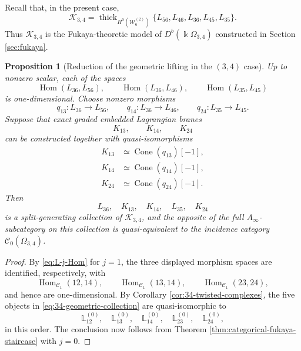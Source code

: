 \documentclass[12pt,a4paper,english,reqno]{amsart}
\theoremstyle{plain}
\newtheorem{proposition}[theorem]{Proposition}
\theoremstyle{definition}
\newcommand{\Hom}{\operatorname{Hom}}
\newcommand{\C}{\mathcal C}
\begin{document}
Recall that, in the present case,
\[
\mathcal K_{3,4}
=
\operatorname{thick}_{H^0(\mathcal W_6^{(2)})}
\{L_{56},L_{46},L_{36},L_{45},L_{35}\}.
\]
Thus $\mathcal K_{3,4}$ is the Fukaya-theoretic model of
$D^b(\Bbbk\Omega_{3,4})$ constructed in Section \ref{sec:fukaya}.

\begin{proposition}[Reduction of the geometric lifting in the $(3,4)$ case]
\label{prop:34-geometric-reduction}
Up to nonzero scalar, each of the spaces
\[
 \Hom(L_{36},L_{56}),\qquad
 \Hom(L_{36},L_{46}),\qquad
 \Hom(L_{35},L_{45})
\]
is one-dimensional.  Choose nonzero morphisms
\[
 q_{13}\colon L_{36}\longrightarrow L_{56},\qquad
 q_{14}\colon L_{36}\longrightarrow L_{46},\qquad
 q_{24}\colon L_{35}\longrightarrow L_{45}.
\]
Suppose that exact graded embedded Lagrangian branes
\[
 K_{13},\qquad K_{14},\qquad K_{24}
\]
can be constructed together with quasi-isomorphisms
\[
\begin{aligned}
 K_{13}&\simeq\operatorname{Cone}(q_{13})[-1],\\
 K_{14}&\simeq\operatorname{Cone}(q_{14})[-1],\\
 K_{24}&\simeq\operatorname{Cone}(q_{24})[-1].
\end{aligned}
\]
Then
\begin{equation}
 L_{36},\quad K_{13},\quad K_{14},\quad
 L_{35},\quad K_{24}
\label{eq:34-geometric-collection}
\end{equation}
is a split-generating collection of $\mathcal K_{3,4}$, and the opposite of
the full $A_\infty$-subcategory on this collection is quasi-equivalent to the
incidence category
$\C_0(\Omega_{3,4})$.
\end{proposition}

\begin{proof}
By \eqref{eq:L-j-Hom} for $j=1$, the three displayed morphism spaces are
identified, respectively, with
\[
 \Hom_{\C_1}(12,14),\qquad
 \Hom_{\C_1}(13,14),\qquad
 \Hom_{\C_1}(23,24),
\]
and hence are one-dimensional.  By
Corollary \ref{cor:34-twisted-complexes}, the five objects in
\eqref{eq:34-geometric-collection} are quasi-isomorphic to
\[
 \mathbb L_{12}^{(0)},\quad
 \mathbb L_{13}^{(0)},\quad
 \mathbb L_{14}^{(0)},\quad
 \mathbb L_{23}^{(0)},\quad
 \mathbb L_{24}^{(0)},
\]
in this order.  The conclusion now follows from
Theorem \ref{thm:categorical-fukaya-staircase} with $j=0$.
\end{proof}
\end{document}
